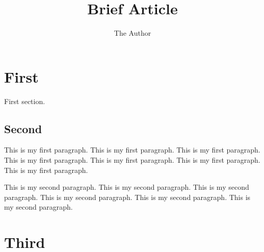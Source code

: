 \documentclass[11pt, oneside]{article}   	%
\title{Brief Article}
\author{The Author}
\begin{document}
\maketitle
\section{First}

First section.

\subsection{Second}

This is my first paragraph.
This is my first paragraph.
This is my first paragraph.
This is my first paragraph.
This is my first paragraph.
This is my first paragraph.
This is my first paragraph.

This is my second paragraph.
This is my second paragraph.
This is my second paragraph.
This is my second paragraph.
This is my second paragraph.
This is my second paragraph.

\section{Third}
\end{document}

